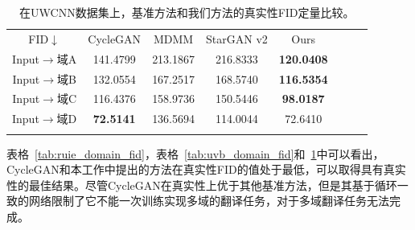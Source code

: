 \begin{table}[ht]
\centering
\caption{在UWCNN数据集上，基准方法和我们方法的真实性FID定量比较。}
  \begin{tabular}{c|ccccccc}
    \hline\noalign{\smallskip}
    FID$\downarrow$ & CycleGAN & MDMM & StarGAN v2 & Ours \\
    \noalign{\smallskip}\hline\noalign{\smallskip}
    Input$\rightarrow$域A & 141.4799 & 213.1867 & 216.8333 & \textbf{120.0408}  \\
    Input$\rightarrow$域B & 132.0554 & 167.2517 & 168.5740 & \textbf{116.5354}  \\
    Input$\rightarrow$域C & 116.4376 & 158.9736 & 150.5446 & \textbf{98.0187}  \\
    Input$\rightarrow$域D & \textbf{72.5141}  & 136.5694 & 114.0044 & 72.6410  \\
    \noalign{\smallskip}\hline
  \end{tabular}
  \label{tab:uwcnn_domain_fid}
\end{table}

表格~\ref{tab:ruie_domain_fid}，表格~\ref{tab:uvb_domain_fid}和~\ref{tab:uwcnn_domain_fid}中可以看出，CycleGAN和本工作中提出的方法在真实性FID的值处于最低，可以取得具有真实性的最佳结果。尽管CycleGAN在真实性上优于其他基准方法，但是其基于循环一致的网络限制了它不能一次训练实现多域的翻译任务，对于多域翻译任务无法完成。

